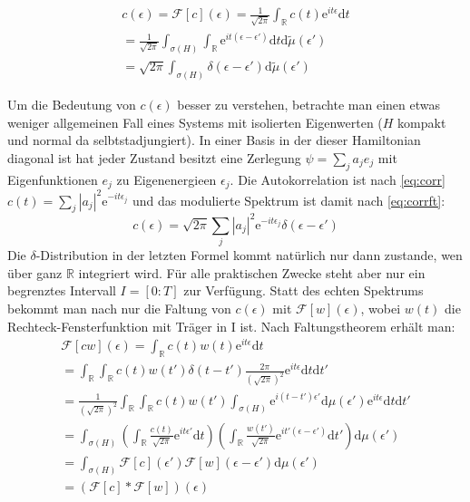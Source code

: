\documentclass[10pt,a4paper,german]{scrartcl}
\begin{document}
		\begin{multline}
			\label{eq:corrft}
			c(\epsilon) = \mathcal{F}[c](\epsilon)
			      = \frac{1}{\sqrt{2 \pi}}
			     		\int_{\mathbb{R}} c(t) \mathrm{e}^{it \epsilon} \mathrm{d}t\\
			     = \frac{1}{\sqrt{2 \pi}}
		     			\int_{\sigma(H)}
				     		\int_{\mathbb{R}} \mathrm{e}^{i t (\epsilon -\epsilon')}	\mathrm{d}t
					 		\mathrm{d} \tilde{\mu}(\epsilon')\\
			     = \sqrt{2 \pi}
			     		\int_{\sigma(H)} \delta(\epsilon -\epsilon')
					 		\mathrm{d} \tilde{\mu}(\epsilon')
		\end{multline}

		Um die Bedeutung von $c(\epsilon)$ besser zu verstehen, betrachte man einen
		etwas weniger allgemeinen Fall eines Systems mit isolierten Eigenwerten
		($H$ kompakt und normal da selbtstadjungiert). In einer Basis in der
		dieser Hamiltonian diagonal ist hat jeder Zustand besitzt eine Zerlegung
		$\psi=\sum_{j}{a_j e_j}$ mit Eigenfunktionen $e_j$ zu Eigenenergieen $\epsilon_j$.
		Die Autokorrelation ist nach \eqref{eq:corr}
		$c(t)= \sum_{j} |a_j|^2 \mathrm{e}^{-i t \epsilon_j}$ und das modulierte Spektrum
		ist damit nach \eqref{eq:corrft}:
		\begin{equation}
			c(\epsilon)=\sqrt{2 \pi}
				 \sum_{j} |a_j|^2 \mathrm{e}^{-i t \epsilon_j} \delta(\epsilon-\epsilon')
		\end{equation}
		Die $\delta$-Distribution in der letzten Formel kommt natürlich nur dann zustande,
		wen über ganz $\mathbb{R}$ integriert wird. Für alle praktischen Zwecke steht
		aber nur ein begrenztes Intervall $I=[0:T]$ zur Verfügung. Statt des echten
		Spektrums	bekommt man nach nur die Faltung von $c(\epsilon)$ mit
		$\mathcal{F}[w](\epsilon)$,
		wobei $w(t)$ die Rechteck-Fensterfunktion mit Träger in I ist. Nach Faltungstheorem
		erhält man:
		\begin{multline}
			\mathcal{F}[c w](\epsilon)
				= \int_{\mathbb{R}} c(t) w(t) \mathrm{e}^{i t \epsilon} \mathrm{d}t \\
				= \int_{\mathbb{R}}
					 	\int_{\mathbb{R}}
					 		 c(t) w(t') \delta(t-t') \frac{2 \pi}{(\sqrt{2 \pi})^2}
					 		 	 \mathrm{e}^{i t \epsilon}
						\mathrm{d}t
					\mathrm{d}t'\\
				= \frac{1}{(\sqrt{2 \pi})^2} \int_{\mathbb{R}}
					 	\int_{\mathbb{R}}
					 		 c(t) w(t')
					 		   \int_{\sigma(H)} \mathrm{e}^{i (t - t')\epsilon'}
					 		   \mathrm{d}\mu(\epsilon')
					 		 	 \mathrm{e}^{i t \epsilon}
						\mathrm{d}t
					\mathrm{d}t'\\
				=
 		  	\int_{\sigma(H)}
					\left(\int_{\mathbb{R}}
						 \frac{c(t)}{\sqrt{2 \pi}} \mathrm{e}^{i t\epsilon'} \mathrm{d}t\right)
					\left(\int_{\mathbb{R}}
						\frac{w(t')}{\sqrt{2 \pi}}  \mathrm{e}^{i t' (\epsilon-\epsilon')}
							\mathrm{d}t'\right)
				\mathrm{d}\mu(\epsilon')\\
				= \int_{\sigma(H)}
	 		  		\mathcal{F}[c](\epsilon') \mathcal{F}[w](\epsilon-\epsilon')
					\mathrm{d}\mu(\epsilon')\\
				= (\mathcal{F}[c] * \mathcal{F}[w])(\epsilon)
		\end{multline}
\end{document}
